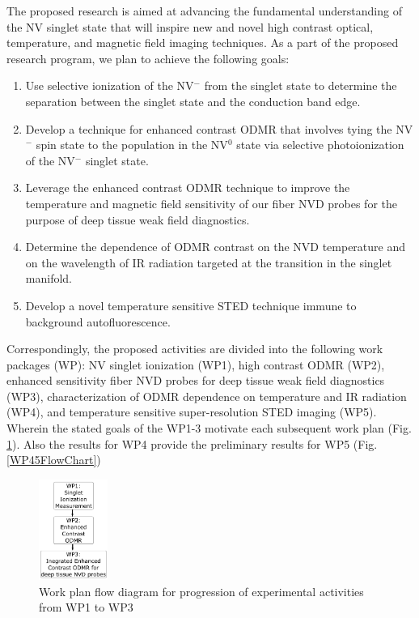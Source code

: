 The proposed research is aimed at advancing the fundamental understanding of the NV singlet state that will
inspire new and novel high contrast optical, temperature, and magnetic field imaging techniques.  As a part of
the proposed research program, we plan to achieve the following goals:
\begin{enumerate}
\item Use selective ionization of the NV$^-$ from the singlet state to determine the separation between the singlet state and the conduction band edge.
\item Develop a technique for enhanced contrast ODMR that involves tying the NV$^-$ spin state to the population in the NV$^0$ state via selective photoionization of the NV$^-$ singlet state.
\item Leverage the enhanced contrast ODMR technique to improve the temperature and magnetic field sensitivity of our fiber NVD probes for the purpose of deep tissue weak field diagnostics.
\item Determine the dependence of ODMR contrast on the NVD temperature and on the wavelength of IR radiation targeted at the transition in the singlet manifold.
\item Develop a novel temperature sensitive STED technique immune to background autofluorescence.
\end{enumerate}

Correspondingly, the proposed activities are divided into the following work packages (WP): NV singlet 
ionization (WP1), high contrast ODMR (WP2), enhanced sensitivity fiber NVD probes for deep tissue weak field 
diagnostics (WP3), characterization of ODMR dependence on temperature and IR radiation (WP4), and temperature 
sensitive super-resolution STED imaging (WP5). Wherein the stated goals of the WP1-3 motivate each 
subsequent work plan (Fig. \ref{WP123FlowChart}). Also the results for WP4 provide the preliminary results 
for WP5 (Fig. \ref{WP45FlowChart})

\begin{figure}
\centering
\includegraphics[width=0.2\textwidth]{Figures/WP123FlowChart.png}
\caption{Work plan flow diagram for progression of experimental activities from WP1 to WP3}
\label{WP123FlowChart}
\end{figure}



